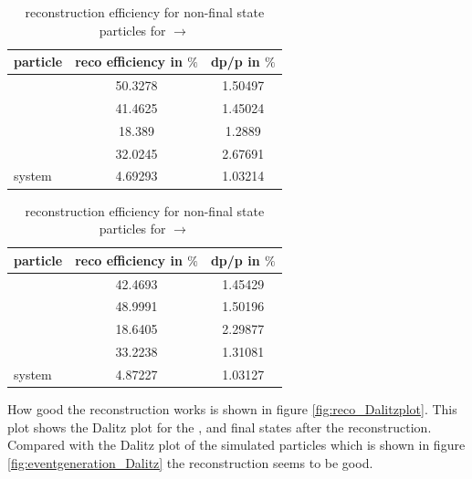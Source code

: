 	\begin{table}
		\centering
		\caption{\propose reconstruction efficiency for non-final state particles for \pbarpSystem $\rightarrow$ \excitedcascade \anticascade}
		\label{tab:non-finalstate_efficiency}
		
		\begin{tabular}{lcc}
		
			\hline
			particle & reco efficiency in $\%$ & dp/p in $\%$ \\\hline
			\hline
			\lam & 50.3278&   1.50497 \\
			\alam & 41.4625&   1.45024\\
			\anticascade & 18.389&   1.2889\\
			\excitedcascade & 32.0245&   2.67691 \\
			\excitedcascade \anticascade system & 4.69293&   1.03214\\\hline
			 	
		\end{tabular}
	\end{table}
	
		\begin{table}
		\centering
		\caption{\propose reconstruction efficiency for non-final state particles for \pbarpSystem $\rightarrow$ \excitedanticascade \cascade}
		\label{tab:non-finalstate_efficiency_cc}
		
		\begin{tabular}{lcc}
		
			\hline
			particle & reco efficiency in $\%$ & dp/p in $\%$ \\\hline
			\hline
			\lam & 42.4693&   1.45429 \\
			\alam & 48.9991&   1.50196\\
			\cascade & 18.6405&   2.29877\\
			\excitedanticascade & 33.2238&   1.31081\\
			\excitedanticascade \cascade system & 4.87227&   1.03127\\\hline
			 	
		\end{tabular}
	\end{table}
	
	How good the reconstruction works is shown in figure \ref{fig:reco_Dalitzplot}.
	This plot shows the Dalitz plot for the \anticascade, \lam and \kminus final states after the reconstruction. 
	Compared with the Dalitz plot of the simulated particles which is shown in figure \ref{fig:eventgeneration_Dalitz} the reconstruction seems to be good.
	
